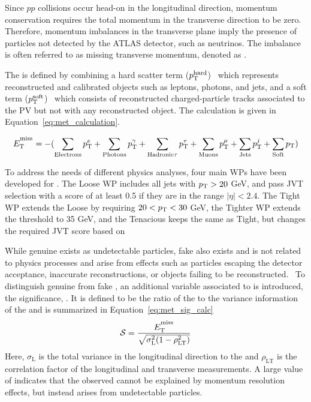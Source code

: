Since $pp$ collisions occur head-on in the longitudinal direction, momentum conservation requires the total momentum in the transverse direction to be zero. Therefore, momentum imbalances in the transverse plane imply the presence of particles not detected by the ATLAS detector, such as neutrinos. The imbalance is often referred to as missing transverse momentum, denoted as \met{}. 

The \met{} is defined by combining a hard scatter term ($p_{\mathrm{T}}^{\mathrm{hard}}$)~\cite{ATLAS:2018ghb} which represents reconstructed and calibrated objects such as leptons, photons, and jets, and a soft term ($p_{\mathrm{T}}^{\mathrm{soft}}$)~\cite{met_soft_term} which consists of reconstructed charged-particle tracks associated to the PV but not with any reconstructed object. The \met{} calculation is given in Equation~\ref{eq:met_calculation}.

\begin{equation}
  \centering
  \met = - (\sum_{\mathrm{Electrons}}{\pt^{e}} + \sum_{\mathrm{Photons}}{\pt^{\gamma}} + \sum_{\mathrm{Hadronic} \tau}{\pt^{\tau}} + \sum_{\mathrm{Muons}}{\pt^{\mu}} + \sum_{\mathrm{Jets}}{\pt^{j}} + \sum_{\mathrm{Soft}}{\pt})
  \label{eq:met_calculation}
\end{equation}

To address the needs of different physics analyses, four main WPs have been developed for \met{}. The Loose WP includes all jets with $p_{\mathrm{T}} > 20$ GeV, and pass JVT selection with a score of at least 0.5 if they are in the range $|\eta| < 2.4$. The Tight WP extends the Loose by requiring $20 < p_{\mathrm{T}} < 30$ GeV, the Tighter WP extends the \pt{} threshold to 35 GeV, and the Tenacious keeps the same \pt{} as Tight, but changes the required JVT score based on \pt{}~\cite{ATLAS:2018ghb}

While genuine \met{} exists as undetectable particles, fake \met{} also exists and is not related to physics processes and arise from effects such as particles escaping the detector acceptance, inaccurate reconstructions, or objects failing to be reconstructed.~\cite{ATLAS:2018uid} To distinguish genuine \met{} from fake \met{}, an additional variable associated to \met{} is introduced, the \met{} significance, \metsig{}. It is defined to be the ratio of the \met{} to the variance information of the \met{} and is summarized in Equation~\ref{eq:met_sig_calc}
\begin{equation}
  \centering
  \metsig = \frac{\met}{\sqrt{\sigma_{\mathrm{L}}^{2}(1 - \rho_{\mathrm{LT}}^{2})}}
  \label{eq:met_sig_calc}
\end{equation}
Here, $\sigma_{\mathrm{L}}$ is the total variance in the longitudinal direction to the \met{} and $\rho_{\mathrm{LT}}$ is the correlation factor of the longitudinal and transverse measurements. A large value of \metsig{} indicates that the observed \met{} cannot be explained by momentum resolution effects, but instead arises from undetectable particles.